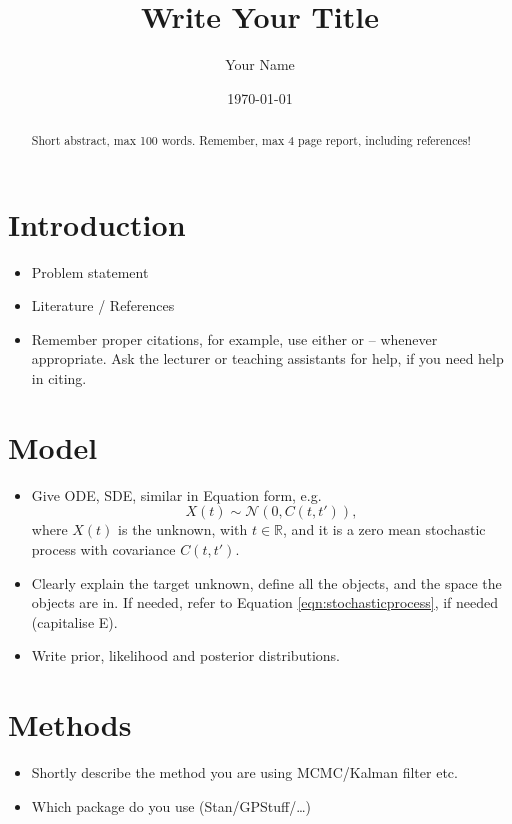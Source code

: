 \documentclass[times, a4paper, 12pt, onecolumn, oneside]{article}
\date{}
\title{Write Your Title}
\author{Your Name}
\date{\today}
\begin{document}
\maketitle

\begin{abstract}
    Short abstract, max 100 words. Remember, max 4 page report, including references!
\end{abstract}

\section{Introduction}
\begin{itemize}
    \item Problem statement
    \item Literature / References 
    \item Remember proper citations, for example,  use either \citet{Lindgren2011} or \citep{Roininen2014} -- whenever appropriate. Ask the lecturer or teaching assistants for help, if you need help in citing. 
\end{itemize}


\section{Model}

\begin{itemize}
    \item Give ODE, SDE, similar in Equation form, e.g. 
    \begin{equation} \label{eqn:stochasticprocess}
        X(t) \sim \mathcal N (0,C(t,t')),
    \end{equation}
    where $X(t)$ is the unknown, with $t\in\mathbb{R}$, and it is a zero mean stochastic process with covariance $C(t,t')$.
    \item Clearly explain the target unknown, define all the objects, and the space the objects are in. If needed, refer to Equation \eqref{eqn:stochasticprocess}, if needed (capitalise E).
    \item Write prior, likelihood and posterior distributions.
\end{itemize}

\section{Methods}

\begin{itemize}
    \item Shortly describe the method you are using MCMC/Kalman filter etc.
    \item Which package do you use (Stan/GPStuff/\dots)
\end{itemize}
\end{document}
